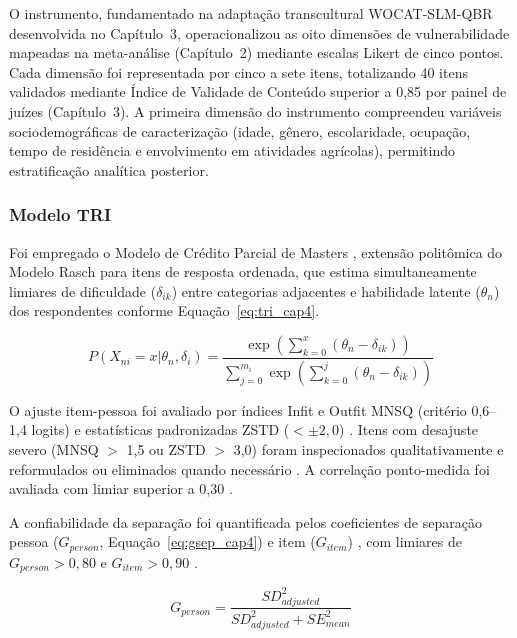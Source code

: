 O instrumento, fundamentado na adaptação transcultural WOCAT-SLM-QBR desenvolvida no Capítulo~3, operacionalizou as oito dimensões de vulnerabilidade mapeadas na meta-análise (Capítulo~2) mediante escalas Likert de cinco pontos. Cada dimensão foi representada por cinco a sete itens, totalizando 40 itens validados mediante Índice de Validade de Conteúdo superior a 0,85 por painel de juízes (Capítulo~3). A primeira dimensão do instrumento compreendeu variáveis sociodemográficas de caracterização (idade, gênero, escolaridade, ocupação, tempo de residência e envolvimento em atividades agrícolas), permitindo estratificação analítica posterior.

\subsubsection{Modelo TRI}

Foi empregado o Modelo de Crédito Parcial de Masters \cite{Masters1982}, extensão politômica do Modelo Rasch \cite{Rasch1960} para itens de resposta ordenada, que estima simultaneamente limiares de dificuldade ($\delta_{ik}$) entre categorias adjacentes e habilidade latente ($\theta_n$) dos respondentes conforme Equação~\ref{eq:tri_cap4}.

\begin{equation}
P(X_{ni}=x|\theta_n, \delta_i) = \frac{\exp\left(\sum_{k=0}^{x}(\theta_n - \delta_{ik})\right)}{\sum_{j=0}^{m_i}\exp\left(\sum_{k=0}^{j}(\theta_n - \delta_{ik})\right)}
\label{eq:tri_cap4}
\end{equation}

O ajuste item-pessoa foi avaliado por índices Infit e Outfit MNSQ (critério 0,6--1,4 logits) e estatísticas padronizadas ZSTD ($< \pm 2{,}0$) \cite{Wright1994,Linacre2002}. Itens com desajuste severo (MNSQ $>$ 1,5 ou ZSTD $>$ 3,0) foram inspecionados qualitativamente e reformulados ou eliminados quando necessário \cite{Wilson2005}. A correlação ponto-medida foi avaliada com limiar superior a 0,30 \cite{Bond2020}.

A confiabilidade da separação foi quantificada pelos coeficientes de separação pessoa ($G_{person}$, Equação~\ref{eq:gsep_cap4}) e item ($G_{item}$) \cite{Wright1996}, com limiares de $G_{person} > 0{,}80$ e $G_{item} > 0{,}90$ \cite{Fisher2007}.

\begin{equation}
G_{person} = \frac{SD_{adjusted}^2}{SD_{adjusted}^2 + SE_{mean}^2}
\label{eq:gsep_cap4}
\end{equation}

